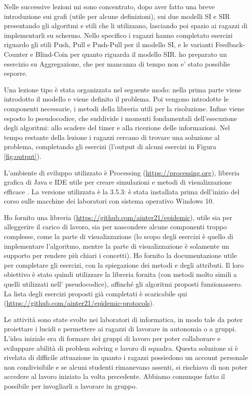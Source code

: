 Nelle successive lezioni mi sono concentrato, dopo aver fatto una breve introduzione sui grafi (utile per alcune definizioni), sui due modelli SI e SIR presentando gli algoritmi e stili che li utilizzano, lasciando poi spazio ai ragazzi di implementarli su schermo. Nello specifico i ragazzi hanno completato esercizi riguardo gli stili Push, Pull e Push-Pull per il modello SI, e le varianti Feedback-Counter e Blind-Coin per quanto riguarda il modello SIR. ho preparato un esercizio su Aggregazione, che per mancanza di tempo non e' stato possiblie esporre.

Una lezione tipo è stata organizzata nel seguente modo: nella prima parte viene introdotto il modello e viene definito il problema. Poi vengono introdotte le componenti necessarie, i metodi della libreria utili per la risoluzione. Infine viene esposto lo pseudocodice, che suddivide i momenti fondamentali dell'esecuzione degli algoritmi: allo scadere del timer e alla ricezione delle informazioni. Nel tempo restante della lezione i ragazzi cercano di trovare una soluzione al problema, completando gli esercizi (l'output di alcuni esercizi in Figura \ref{fig:output}).

L’ambiente di sviluppo utilizzato è Processing (\href{https://processing.org}{https://processing.org}), libreria grafica di Java e IDE utile per creare simulazioni e metodi di visualizzazione efficace \cite{processing_wikipedia}. La versione utilizzata è la 3.5.3: è stata installata prima dell'inizio del corso sulle macchine dei laboratori con sistema operativo Windows 10.

Ho fornito una libreria (\href{https://github.com/ainter21/epidemic}{https://github.com/ainter21/epidemic}), utile sia per alleggerire il carico di lavoro, sia per nascondere alcune componenti troppo complesse, come la parte di visualizzazione (lo scopo degli esercizi è quello di implementare l’algoritmo, mentre la parte di visualizzazione è solamente un supporto per rendere più chiari i concetti).
Ho fornito la documentazione utile per completare gli esercizi, con la spiegazione dei metodi e degli attributi. Il loro obiettivo è stato quindi utilizzare la libreria fornita (con metodi molto simili a quelli utilizzati nell' pseudocodice), affinché gli algoritmi proposti funzionassero. La lista degli esercizi proposti già completati è scaricabile qui (\href{https://github.com/ainter21/epidemic-protocols}{https://github.com/ainter21/epidemic-protocols}).

Le attività sono state svolte nei laboratori di informatica, in modo tale da poter proiettare i lucidi e permettere ai ragazzi di lavorare in autonomia o a gruppi. L'idea iniziale era di formare dei gruppi di lavoro per poter collaborare e sviluppare abilità di problem solving e lavoro di squadra. Questa soluzione si è rivelata di difficile attuazione in quanto i ragazzi possiedono un account personale non condivisibile e se alcuni studenti rimanevano assenti, si rischiava di non poter accedere al lavoro iniziato la volta precedente. Abbiamo comunque fatto il possibile per invogliarli a lavorare in gruppo.

